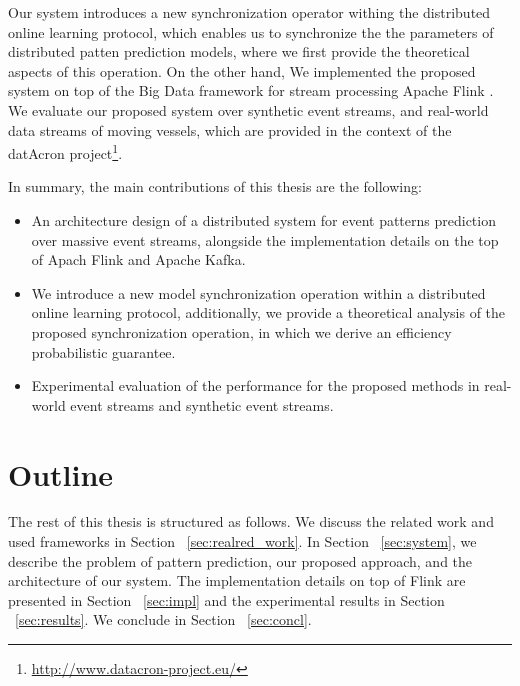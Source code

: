 \par Our system introduces a new synchronization operator withing the distributed online learning protocol, which enables us to synchronize the the parameters of distributed patten prediction models, where we first provide the theoretical aspects of this operation. On the other hand, We implemented the proposed system on top of the Big Data framework for stream processing Apache Flink \cite{Flink}. We evaluate our proposed system over synthetic event streams, and real-world data streams of moving vessels, which are provided in the context of the datAcron project\footnote{\url{http://www.datacron-project.eu/}}.

In summary, the main contributions of this thesis are the following:

\begin{itemize}
	\item An architecture design of a distributed system for  event patterns prediction over massive event streams, alongside the implementation details on the top of Apach Flink and Apache Kafka.  
	\item We introduce a new model synchronization operation within a distributed online learning protocol, additionally,  we provide a theoretical analysis of the proposed synchronization operation, in which we derive an  efficiency probabilistic guarantee. 
	\item Experimental evaluation of the performance for the proposed methods in real- world  event streams and synthetic event streams.
  
\end{itemize}
\section{Outline }

\par The rest of this thesis is structured as follows. We discuss the related work and used frameworks in Section ~\ref{sec:realred_work}. In Section ~\ref{sec:system}, we describe the problem of pattern prediction, our proposed approach, and the architecture of our system. The implementation details on top of Flink are presented in Section ~\ref{sec:impl} and the experimental results in Section ~\ref{sec:results}. We conclude in Section ~\ref{sec:concl}.



